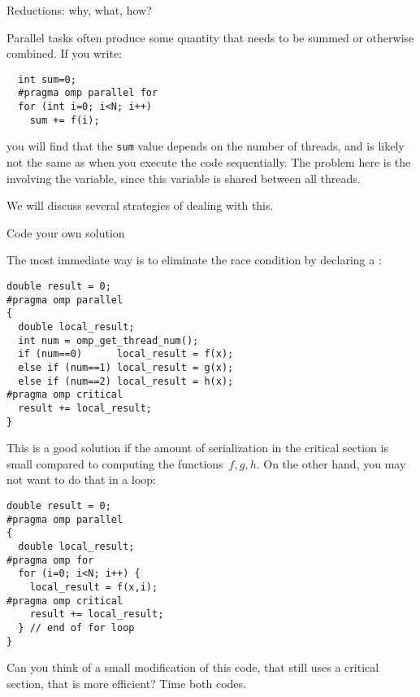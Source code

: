 
\label{sec:reduction}

 {Reductions: why, what, how?}

Parallel tasks often produce some quantity that needs to be summed
or otherwise combined.
If you write:
\begin{lstlisting}
  int sum=0;
  #pragma omp parallel for
  for (int i=0; i<N; i++)
    sum += f(i);
\end{lstlisting}
you will find that the \lstinline{sum} value depends on the number of threads,
and is likely not the same as when you execute the code sequentially.
The problem here is the  involving the 
variable, since this variable is shared between all threads.

We will discuss several strategies of dealing with this.

 {Code your own solution}

The most immediate way is to eliminate the race condition
by declaring a :
\begin{lstlisting}
double result = 0;
#pragma omp parallel
{
  double local_result;
  int num = omp_get_thread_num();
  if (num==0)      local_result = f(x);
  else if (num==1) local_result = g(x);
  else if (num==2) local_result = h(x);
#pragma omp critical
  result += local_result;
}
\end{lstlisting}

This is a good solution if the amount of serialization in the critical section
is small compared to computing the functions~$f,g,h$. On the other hand, you
may not want to do that in a loop:
\begin{lstlisting}
double result = 0;
#pragma omp parallel
{
  double local_result;
#pragma omp for
  for (i=0; i<N; i++) {
    local_result = f(x,i);
#pragma omp critical
    result += local_result;
  } // end of for loop
}
\end{lstlisting}
\begin{exercise}
  Can you think of a small modification of this code, that still uses a critical section,
  that is more efficient? Time both codes.
\end{exercise}

